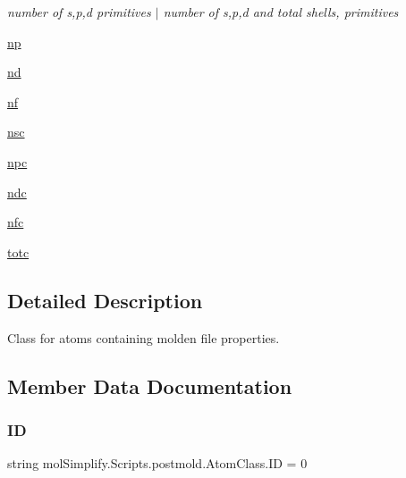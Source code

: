\begin{DoxyCompactItemize}
\begin{DoxyCompactList}\small\item\em number of s,p,d primitives $\vert$ number of s,p,d and total shells, primitives \end{DoxyCompactList}\item 
\hyperlink{classmolSimplify_1_1Scripts_1_1postmold_1_1AtomClass_ad08c8b02f94118ccdb58b2d782b9b354}{np}
\item 
\hyperlink{classmolSimplify_1_1Scripts_1_1postmold_1_1AtomClass_a79e1f663f347546c68f94306973727f4}{nd}
\item 
\hyperlink{classmolSimplify_1_1Scripts_1_1postmold_1_1AtomClass_a0731603152677f0c34fbefcdff61d9e7}{nf}
\item 
\hyperlink{classmolSimplify_1_1Scripts_1_1postmold_1_1AtomClass_ab747c374d5c1e85dd3e60cb811c8455f}{nsc}
\item 
\hyperlink{classmolSimplify_1_1Scripts_1_1postmold_1_1AtomClass_a1c777d5d1871bf720b85c8a7097ae638}{npc}
\item 
\hyperlink{classmolSimplify_1_1Scripts_1_1postmold_1_1AtomClass_a84fcd7aacbbfbdb258e5c82be26723ae}{ndc}
\item 
\hyperlink{classmolSimplify_1_1Scripts_1_1postmold_1_1AtomClass_ab02b75ceb231815873ebec7a3bd8a4cf}{nfc}
\item 
\hyperlink{classmolSimplify_1_1Scripts_1_1postmold_1_1AtomClass_a4d8c969befd45aa1c1f1b256436ddaa4}{totc}
\end{DoxyCompactItemize}


\subsection{Detailed Description}
Class for atoms containing molden file properties. 

\subsection{Member Data Documentation}
\mbox{\label{classmolSimplify_1_1Scripts_1_1postmold_1_1AtomClass_a88654cc776a9ecbdf4ab54ed253a8316}} 
\subsubsection{\texorpdfstring{ID}{ID}}
{\footnotesize\ttfamily string mol\+Simplify.\+Scripts.\+postmold.\+Atom\+Class.\+ID = \textquotesingle{}0\textquotesingle{}\hspace{0.3cm}{\ttfamily [static]}}



